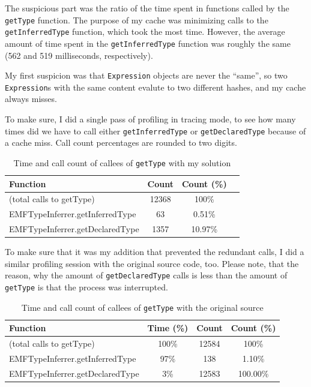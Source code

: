 \documentclass[11pt,a4paper,oneside]{report}
\begin{document}
The suspicious part was the ratio of the time spent in functions called by the
\texttt{getType} function. The purpose of my cache was minimizing calls to the
\texttt{getInferredType} function, which took the most time. However, the
average amount of time spent in the \texttt{getInferredType} function was
roughly the same (562 and 519 milliseconds, respectively).

My first suspicion was that \texttt{Expression} objects are never the ``same'',
so two \texttt{Expression}s with the same content evalute to two different
hashes, and my cache always misses.

To make sure, I did a single pass of profiling in tracing mode, to see how many
times did we have to call either \texttt{getInferredType} or
\texttt{getDeclaredType} because of a cache miss. Call count percentages are
rounded to two digits.

\begin{table}[ht]
    \footnotesize
    \centering
    \begin{tabular}{ l c c c }
        \toprule
        Function & Count & Count (\%) \\
        \midrule
        (total calls to getType) & 12368 & 100\% \\
        EMFTypeInferrer.getInferredType & 63 & 0.51\% \\
        EMFTypeInferrer.getDeclaredType & 1357 & 10.97\% \\
        \bottomrule
    \end{tabular}
    \caption{Time and call count of callees of \texttt{getType} with my solution}
    \label{tab:first-solution-call-counts}
\end{table}

To make sure that it was my addition that prevented the redundant calls, I did a
similar profiling session with the original source code, too. Please note, that
the reason, why the amount of \texttt{getDeclaredType} calls is less than the
amount of \texttt{getType} is that the process was interrupted.

\begin{table}[ht]
    \footnotesize
    \centering
    \begin{tabular}{ l c c c }
        \toprule
        Function & Time (\%) & Count & Count (\%) \\
        \midrule
        (total calls to getType) & 100\% & 12584 & 100\% \\
        EMFTypeInferrer.getInferredType & 97\% & 138 & 1.10\% \\
        EMFTypeInferrer.getDeclaredType & 3\% & 12583 & 100.00\% \\
        \bottomrule
    \end{tabular}
    \caption{Time and call count of callees of \texttt{getType} with the original source}
    \label{tab:first-solution-call-counts}
\end{table}
\end{document}
